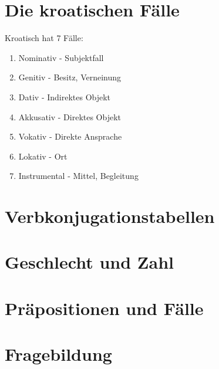 
\section{Die kroatischen Fälle}

Kroatisch hat 7 Fälle:
\begin{enumerate}
    \item Nominativ - Subjektfall
    \item Genitiv - Besitz, Verneinung
    \item Dativ - Indirektes Objekt
    \item Akkusativ - Direktes Objekt
    \item Vokativ - Direkte Ansprache
    \item Lokativ - Ort
    \item Instrumental - Mittel, Begleitung
\end{enumerate}

\section{Verbkonjugationstabellen}


\section{Geschlecht und Zahl}


\section{Präpositionen und Fälle}


\section{Fragebildung}

